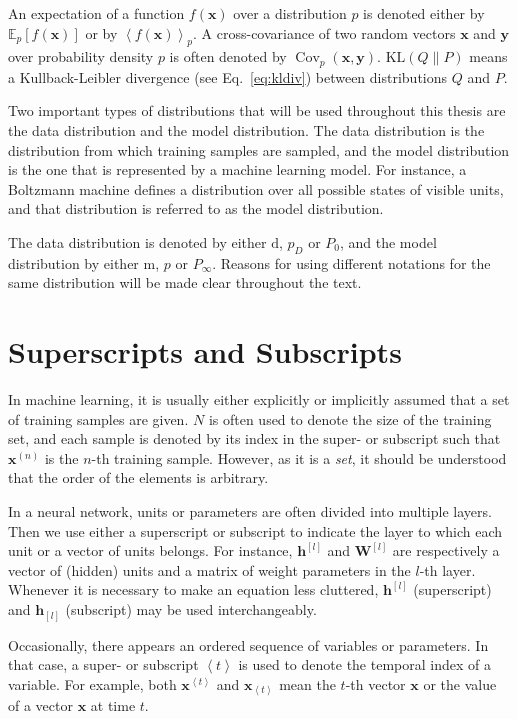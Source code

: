 \documentclass[dissertation,nocontribution,draft*]{aaltoseries}
\newcommand{\qt}[1]{\left<#1\right>}
\newcommand{\qlay}[1]{\left[#1\right]}
\newcommand{\vect}[1]{\mathbf{#1}}
\newcommand{\matr}[1]{\mathbf{#1}}
\newcommand{\cov}[0]{\operatorname{Cov}}
\newcommand{\vh}[0]{\vect{h}}
\newcommand{\vx}[0]{\vect{x}}
\newcommand{\vy}[0]{\vect{y}}
\newcommand{\mW}[0]{\matr{W}}
\newcommand{\td}[0]{\text{d}}
\newcommand{\tf}[0]{\text{m}}
\newcommand{\KL}[0]{\text{KL}}
\newcommand{\E}[0]{\mathbb{E}}
\begin{document}
An expectation of a function $f(\vx)$ over a distribution
$p$ is denoted either by $\E_p\left[ f(\vx) \right]$ or by
$\left< f(\vx) \right>_p$. A cross-covariance of two random
vectors $\vx$ and $\vy$ over probability density $p$ is
often denoted by $\cov_p(\vx, \vy)$. $\KL\left( Q \| P
\right)$ means a Kullback-Leibler divergence (see
Eq.~\eqref{eq:kldiv}) between
distributions $Q$ and $P$.

Two important types of distributions that will be used
throughout this thesis are the data distribution and the
model distribution.  The data distribution is the
distribution from which training samples are sampled, and
the model distribution is the one that is represented by a
machine learning model. For instance, a Boltzmann machine
defines a distribution over all possible states of visible
units, and that distribution is referred to as the model
distribution.

The data distribution is denoted by either $\td$, $p_D$ or $P_0$,
and the model distribution by either $\tf$, $p$ or $P_\infty$.
Reasons for using different notations for the same
distribution will be made clear throughout the text.


\section*{Superscripts and Subscripts}

In machine learning, it is usually either explicitly
or implicitly assumed that a set of training samples are
given. $N$ is often used to denote the size of the training set,
and each sample is denoted by its index in the super- or
subscript such that $\vx^{(n)}$ is the $n$-th training
sample. However, as it is a \textit{set}, it should be
understood that the order of the elements is arbitrary.

In a neural network, units or parameters are often divided
into multiple layers. Then we use either a superscript or
subscript to indicate the layer to which each unit or a
vector of units belongs. For instance, $\vh^{\qlay{l}}$ and
$\mW^{\qlay{l}}$ are respectively a vector of (hidden) units
and a matrix of weight parameters in the $l$-th layer.
Whenever it is necessary to make an equation less cluttered,
$\vh^{\qlay{l}}$ (superscript) and $\vh_{\qlay{l}}$
(subscript) may be used interchangeably.

Occasionally, there appears an ordered sequence of variables
or parameters. In that case, a super- or subscript $\qt{t}$
is used to denote the temporal index of a variable.  For
example, both $\vx^{\qt{t}}$ and $\vx_{\qt{t}}$ mean the
$t$-th vector $\vx$ or the value of a vector $\vx$ at time
$t$.
\end{document}
